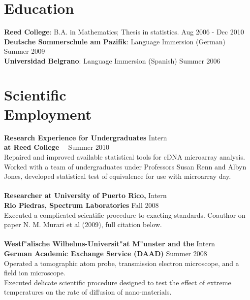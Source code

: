 \documentclass[margin,line]{resume}
\begin{document}
\begin{resume}
    \section{\mysidestyle Education}
\textbf{Reed College}: B.A. in Mathematics; Thesis in statistics.
 \vspace{1mm} \hfill Aug 2006 - Dec 2010 \vspace{1mm}\\
\textbf{Deutsche Sommerschule am Pazifik}:  Language Immersion (German) \vspace{1mm} \hfill Summer 2009
\vspace{1mm} \\
\textbf{Universidad Belgrano}: Language Immersion (Spanish) \vspace{1mm} \hfill Summer 2006 \vspace{1mm}


    \section{\mysidestyle Scientific\\Employment} 
\textbf{Research Experience for Undergraduates} \hfill  Intern \\ 
\textbf{at Reed College} \ \  \hfill Summer 2010 \\
Repaired and improved available statistical tools for cDNA microarray analysis. Worked with a team of undergraduates under Professors Susan Renn and Albyn Jones, developed statistical test of equivalence for use with microarray day. \\
\vspace{-2mm} \\
\textbf{Researcher at University of Puerto Rico,} \hfill  Intern\\
\textbf{Rio Piedras, Spectrum Laboratories} \hfill Fall 2008	\\
Executed a complicated scientific procedure to exacting standards. Coauthor on paper N. M. Murari et al (2009), full citation below.
\\\vspace{-2mm}\\
\textbf{Westf"alische Wilhelms-Universit"at M"unster and the} \hfill  Intern \\
\textbf{German Academic Exchange Service (DAAD)} \hfill Summer 2008	\\
Operated a tomographic atom probe, transmission electron microscope, and a field ion microscope. \\ Executed delicate scientific procedure designed to test the effect of extreme temperatures on the rate of diffusion of nano-materials.


\end{resume}
\end{document}
